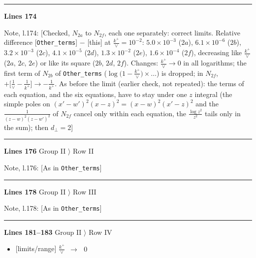 \documentclass[10pt]{article}
\newenvironment{notebox}{\def\FrameCommand{{\color{notebar}\vrule width 1.5pt}\hspace{6pt}}\MakeFramed{\advance\hsize-\width\FrameRestore}\small}{\endMakeFramed}
\begin{document}
\noindent\rule{\linewidth}{0.3pt}\par\noindent\textbf{Lines 174}\par
\begin{notebox}\textsf{\small Note, l.174:} [Checked, $N_{2a}$ to $N_{2f}$, each one separately: correct limits. Relative difference [\texttt{Other\_terms}] $-$ [this] at $\frac{k^{+}}{\vee}=10^{-2}$: $5.0\times10^{-3}$ ($2a$), $6.1\times10^{-6}$ ($2b$), $3.2\times10^{-3}$ ($2c$), $4.1\times10^{-5}$ ($2d$), $1.3\times10^{-2}$ ($2e$), $1.6\times10^{-4}$ ($2f$), decreasing like $\frac{k^{+}}{\vee}$ ($2a$, $2c$, $2e$) or like its square ($2b$, $2d$, $2f$). Changes: $\frac{k^{+}}{\vee}\to0$ in all logarithms; the first term of $N_{2b}$ of \texttt{Other\_terms} ($\log\big(1-\frac{k^{+}}{\vee}\big)\times\dots$) is dropped; in $N_{2f}$, $+\big[\frac{1}{\vee}-\frac{1}{k^{+}}\big]\to-\frac{1}{k^{+}}$. As before the limit (earlier check, not repeated): the terms of each equation, and the six equations, have to stay under one $z$ integral (the simple poles on $(x'-w')^{2}(x-z)^{2}=(x-w)^{2}(x'-z)^{2}$ and the $\frac{1}{(z-w)^{2}(z-w')^{2}}$ of $N_{2f}$ cancel only within each equation, the $\frac{\log z^{2}}{z^{2}}$ tails only in the sum); then $d_{\perp}=2$]\end{notebox}
\noindent\rule{\linewidth}{0.3pt}\par\noindent\textbf{Lines 176} \quad \textsf{Group II $\rangle$ Row II}\par
\begin{notebox}\textsf{\small Note, l.176:} [As in \texttt{Other\_terms}]\end{notebox}
\noindent\rule{\linewidth}{0.3pt}\par\noindent\textbf{Lines 178} \quad \textsf{Group II $\rangle$ Row III}\par
\begin{notebox}\textsf{\small Note, l.178:} [As in \texttt{Other\_terms}]\end{notebox}
\noindent\rule{\linewidth}{0.3pt}\par\noindent\textbf{Lines 181--183} \quad \textsf{Group II $\rangle$ Row IV} \par
\begin{itemize}[leftmargin=2.2em,itemsep=1pt,topsep=2pt]
\item[\textbf{l.181}] \textsf{\small [limits/range]} $\displaystyle \frac{k^{+}}{\vee}$\ $\longrightarrow$\ $\displaystyle \,0$
\end{itemize}
\end{document}

